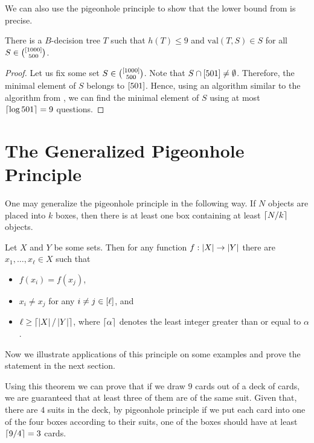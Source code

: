 We can also use the pigeonhole principle to show that the lower bound from
 is precise.
\begin{theorem}
  There is a $B$-decision tree $T$ such that $h(T) \le 9$ and 
  $\mathrm{val}(T, S) \in S$ for all $S \in \binom{{[{1000}]}}{500}$.
\end{theorem}
\begin{proof}
  Let us fix some set $S \in \binom{{[{1000}]}}{500}$. Note that $S \cap
  {[{501}]} \neq \emptyset$. Therefore, the minimal element of $S$ belongs to
  ${[{501}]}$. Hence, using an algorithm similar to the algorithm from
  , we can find the minimal element of $S$
  using at most $\left\lceil {\log{501}} \right\rceil = 9$ questions.
\end{proof}

\section{The Generalized Pigeonhole Principle}
One may generalize the pigeonhole principle in the following way.
If $N$ objects are placed into $k$ boxes, then there is at least one box
containing at least $\left\lceil {N / k} \right\rceil$ objects.
\begin{theorem}
\label{theorem:generalized-pigeonhole-principle}
  Let $X$ and $Y$ be some sets. Then for any function $f : \left|{X}\right| \to
  \left|{Y}\right|$ there are $x_1, \dots, x_\ell \in X$ such that
  \begin{itemize}
    \item $f(x_i) = f(x_j)$,
    \item $x_i \neq x_j$ for any $i \neq j \in {[{\ell}]}$, and
    \item $\ell \ge \left\lceil {\left|{X}\right| / \left|{Y}\right|} \right\rceil$, where
      $\left\lceil {\alpha} \right\rceil$ denotes the least integer greater than or equal to
      $\alpha$.
  \end{itemize}
\end{theorem}

Now we illustrate applications of this principle on some examples and prove the
statement in the next section.

Using this theorem we can prove that if we draw $9$ cards out of a deck of
cards, we are guaranteed that at least three of them are of the same suit.
Given that, there are $4$ suits in the deck, by pigeonhole principle if we put each card into
one of the four boxes according to their suits, one of the boxes should have
at least $\left\lceil {9 / 4} \right\rceil = 3$ cards.

